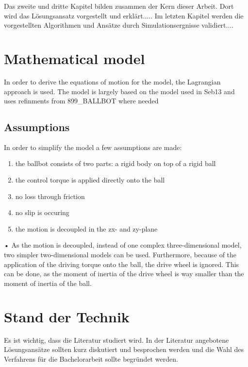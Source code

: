 \documentclass[12pt]{article}
\begin{document}
   Das zweite und dritte Kapitel bilden zusammen der Kern dieser Arbeit. Dort wird das Lösungsansatz vorgestellt und erklärt.....
   Im letzten Kapitel werden die vorgestellten Algorithmen und Ansätze durch Simulationsergnisse validiert....




\newpage
\section{Mathematical model}
In order to derive the equations of motion for the model, the Lagrangian approach is used. The model is largely based on the model used in Seb13 and uses refinments from 899_BALLBOT where needed
\subsection{Assumptions}
In order to simplify the model a few assumptions are made:
\begin{enumerate}
\item the ballbot consists of two parts: a rigid body on top of a rigid ball
\item the control torque is applied directly onto the ball
\item no loss through friction
\item no slip is occuring
\item the motion is decoupled in the zx- and zy-plane
\end{enumerate}•
As the motion is decoupled, instead of one complex three-dimensional model, two simpler two-dimensional models can be used.
Furthermore, because of the application of the driving torque onto the ball, the drive wheel is ignored. This can be done, as the moment of inertia of the drive wheel is way smaller than the moment of inertia of the ball.


\newpage
\section{Stand der Technik}
Es ist wichtig, dass die Literatur studiert wird. In der Literatur angebotene Lösungsansätze sollten kurz diskutiert und besprochen werden und die Wahl des Verfahrens für die Bachelorarbeit sollte begründet werden.
\newpage
\end{document}
